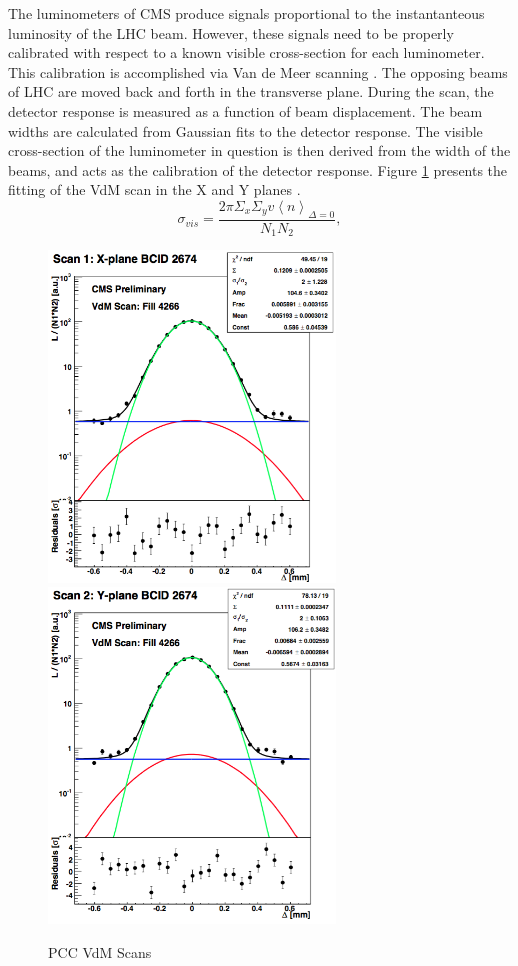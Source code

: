 The luminometers of CMS produce signals proportional to the instantanteous luminosity of the LHC beam. However, these signals need to be properly calibrated with respect to a known visible cross-section for each luminometer. This calibration is accomplished via Van de Meer scanning \cite{vanderMeer:1968zz}. The opposing beams of LHC are moved back and forth in the transverse plane. During the scan, the detector response is measured as a function of beam displacement. The beam widths are calculated from Gaussian fits to the detector response. The visible cross-section of the luminometer in question is then derived from the width of the beams, and acts as the calibration of the detector response. Figure \ref{fig:pccVdMScans} presents the fitting of the VdM scan in the X and Y planes \cite{CMS:2013gfa}. 
\begin{equation}
\sigma_{vis} = \frac{2 \pi \Sigma_x \Sigma_y v\left \langle n \right \rangle_{\Delta=0}}{N_1 N_2},
\end{equation}

\begin{figure}[]
\begin{centering}
\includegraphics[width=3in]{Chapter4/importfigs/CMS-PAS-LUM-15-001_Figure_005-a.png}
\includegraphics[width=3in]{Chapter4/importfigs/CMS-PAS-LUM-15-001_Figure_005-b.png}
\par\end{centering}
\caption{PCC VdM Scans \cite{CMS:2013gfa} \label{fig:pccVdMScans}}
\end{figure}

